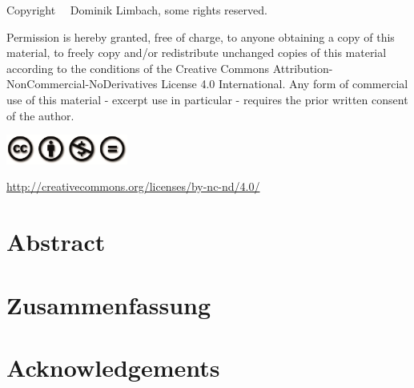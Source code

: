 \documentclass[
    12pt,
    a4paper,
	chapterprefix=false,
	parskip=full,
	headings=normal,
	numbers=noenddot
]{scrreprt}
\begin{document}
\thispagestyle{empty}

\clearpage
\vspace*{\fill}
\small
\begin{center}

	Copyright \textcopyright \ \the\year \ Dominik Limbach, some rights reserved.
	
	\begin{minipage}{0.85\textwidth}
		Permission is hereby granted, free of charge, to anyone obtaining a copy of this material, to freely copy and/or redistribute unchanged copies of this material according to the conditions of the Creative Commons Attribution-NonCommercial-NoDerivatives License 4.0 International. Any form of commercial use of this material - excerpt use in particular - requires the prior written consent of the author.
	\end{minipage}
	
	\includegraphics[width=4cm]{images/cc_by_nc_nd}
	
	\href{http://creativecommons.org/licenses/by-nc-nd/4.0/}{http://creativecommons.org/licenses/by-nc-nd/4.0/}

\end{center}
\normalsize
\thispagestyle{empty}
\clearpage

\newpage


\chapter*{Abstract}
\setcounter{page}{1}



\newpage


\chapter*{Zusammenfassung}



\newpage 

\chapter*{Acknowledgements}
\end{document}
